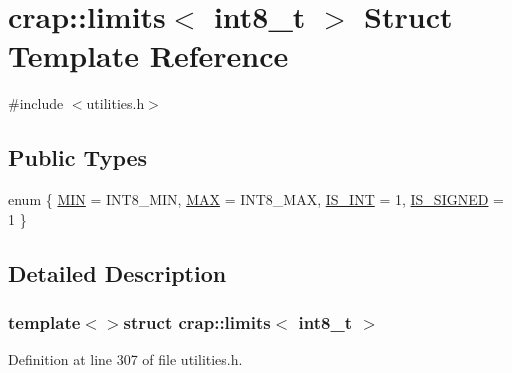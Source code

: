 \hypertarget{structcrap_1_1limits_3_01int8__t_01_4}{\section{crap\+:\+:limits$<$ int8\+\_\+t $>$ Struct Template Reference}
\label{structcrap_1_1limits_3_01int8__t_01_4}
}


{\ttfamily \#include $<$utilities.\+h$>$}

\subsection*{Public Types}
\begin{DoxyCompactItemize}
\item 
enum \{ \hyperlink{structcrap_1_1limits_3_01int8__t_01_4_a3eacc58f947ef7cce3bb5f7b46b73a2aa6823d6bcb5d7b70e7f8322dd0c7fd7df}{M\+I\+N} = I\+N\+T8\+\_\+\+M\+I\+N, 
\hyperlink{structcrap_1_1limits_3_01int8__t_01_4_a3eacc58f947ef7cce3bb5f7b46b73a2aa9543c5a48d5992dc82e76d69429da979}{M\+A\+X} = I\+N\+T8\+\_\+\+M\+A\+X, 
\hyperlink{structcrap_1_1limits_3_01int8__t_01_4_a3eacc58f947ef7cce3bb5f7b46b73a2aacbd9edde5039c13a6d9b426a2a5572ce}{I\+S\+\_\+\+I\+N\+T} = 1, 
\hyperlink{structcrap_1_1limits_3_01int8__t_01_4_a3eacc58f947ef7cce3bb5f7b46b73a2aa258700f71fd08d84a95da134315f85c4}{I\+S\+\_\+\+S\+I\+G\+N\+E\+D} = 1
 \}
\end{DoxyCompactItemize}


\subsection{Detailed Description}
\subsubsection*{template$<$$>$struct crap\+::limits$<$ int8\+\_\+t $>$}



Definition at line 307 of file utilities.\+h.



